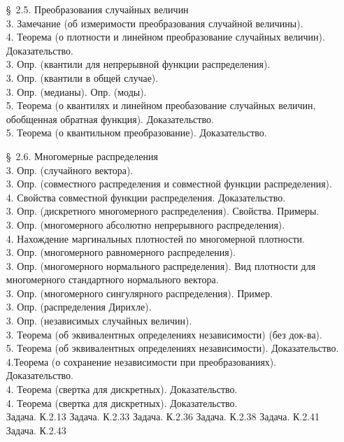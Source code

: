 \documentclass[10pt]{amsart}
\begin{document}
\begin{enumerate}
\begin{enumerate}
\item[\S\, 2.5.] Преобразования случайных величин \\
3. Замечание (об измеримости преобразования случайной величины). \\
4. Теорема (о плотности и линейном преобразование случайных величин). Доказательство. \\
3. Опр. (квантили для непрерывной функции распределения). \\
3. Опр. (квантили в общей случае). \\
3. Опр. (медианы).   Опр. (моды). \\
5. Теорема (о квантилях и линейном преобазование случайных величин, обобщенная обратная функция). Доказательство. \\
5. Теорема (о квантильном преобразование). Доказательство. \\

    
\item[\S\, 2.6.] Многомерные распределения \\
3. Опр. (случайного вектора). \\
3. Опр. (совместного распределения и  совместной функции распределения). \\
4. Свойства совместной функции распределения. Доказательство. \\
3. Опр. (дискретного многомерного распределения). Свойства. Примеры. \\
3. Опр. (многомерного абсолютно непрерывного распределения). \\
4. Нахождение маргинальных плотностей по многомерной плотности. \\
3. Опр. (многомерного равномерного распределения). \\
3. Опр. (многомерного нормального распределения). Вид плотности для многомерного стандартного нормального вектора. \\ 
3. Опр. (многомерного сингулярного распределения). Пример. \\
3. Опр. (распределения Дирихле). \\
3. Опр. (независимых случайных величин). \\
3. Теорема (об эквивалентных определениях независимости) (без док-ва). \\
5. Теорема (об эквивалентных определениях независимости). Доказательство. \\
4.Теорема (о сохранение независимости при преобразованиях). Доказательство. \\ 
4. Теорема (свертка для дискретных). Доказательство. \\
4. Теорема (свертка для дискретных).  Доказательство. \\
Задача. К.2.13
Задача. К.2.33
Задача. К.2.36
Задача. К.2.38
Задача. К.2.41
Задача. К.2.43
\end{enumerate}
    

\end{enumerate}
\end{document}
